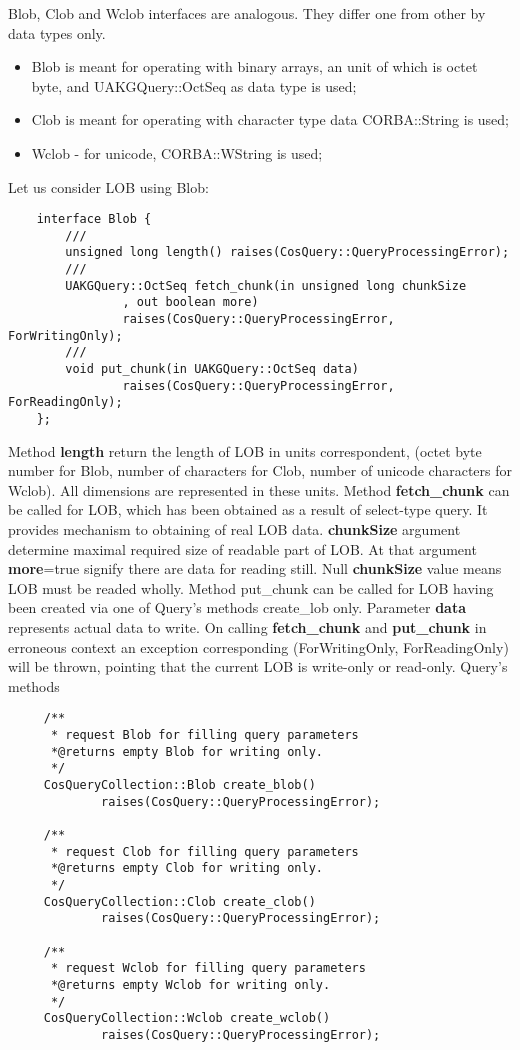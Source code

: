 \documentclass[10pt]{article}
\begin{document}
  Blob, Clob and Wclob interfaces are analogous. They differ one from other
  by data types only.
 \begin{itemize}
   \item Blob is meant for operating with binary arrays, an unit of which is octet byte,
         and UAKGQuery::OctSeq as data type is used;
   \item Clob is meant for operating with character type data CORBA::String is used;
   \item Wclob - for unicode, CORBA::WString is used;
 \end{itemize}
  Let us consider LOB using Blob:
\begin{verbatim}
    interface Blob {
        ///
        unsigned long length() raises(CosQuery::QueryProcessingError);
        ///
        UAKGQuery::OctSeq fetch_chunk(in unsigned long chunkSize
                , out boolean more)
                raises(CosQuery::QueryProcessingError, ForWritingOnly);
        ///
        void put_chunk(in UAKGQuery::OctSeq data)
                raises(CosQuery::QueryProcessingError, ForReadingOnly);
    };
\end{verbatim}
  Method {\bf length} return the length of LOB in units correspondent,
  (octet byte number for Blob, number of characters for Clob,
  number of unicode characters for Wclob).
  All dimensions are represented in these units.
  Method {\bf fetch\_chunk} can be called for LOB, which has been obtained as a result
  of select-type query. It provides mechanism to obtaining of real LOB data.
  {\bf chunkSize} argument determine maximal required size of readable part of LOB. 
  At that argument {\bf more}=true signify there are data for reading still.
  Null {\bf chunkSize} value means LOB must be readed wholly.
  Method put\_chunk can be called for LOB having been created via one of Query's
  methods create\_<B|C|Wc>lob only. Parameter {\bf data} represents actual data
  to write.
  On calling {\bf fetch\_chunk} and {\bf put\_chunk} in erroneous context an exception
  corresponding (ForWritingOnly, ForReadingOnly) will be thrown, pointing that the
  current LOB is write-only or read-only.
  Query's methods 
\begin{verbatim}
     /**
      * request Blob for filling query parameters
      *@returns empty Blob for writing only.
      */
     CosQueryCollection::Blob create_blob()
             raises(CosQuery::QueryProcessingError);

     /**
      * request Clob for filling query parameters
      *@returns empty Clob for writing only.
      */
     CosQueryCollection::Clob create_clob()
             raises(CosQuery::QueryProcessingError);

     /**
      * request Wclob for filling query parameters
      *@returns empty Wclob for writing only.
      */
     CosQueryCollection::Wclob create_wclob()
             raises(CosQuery::QueryProcessingError);
\end{verbatim}
\end{document}
